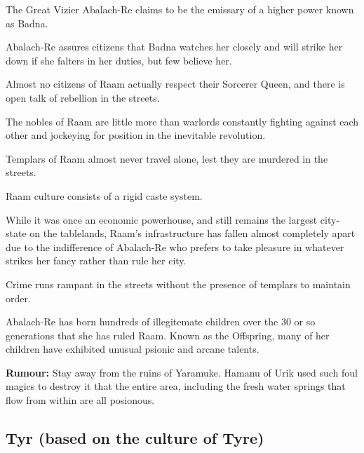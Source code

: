 \begin{multicols}{2}
\begin{description}
    \item The Great Vizier Abalach-Re claims to be the emissary of a higher power known as Badna.
    \item Abalach-Re assures citizens that Badna watches her closely and will strike her down if she falters in her duties, but few believe her.
    \item Almost no citizens of Raam actually respect their Sorcerer Queen, and there is open talk of rebellion in the streets.
    \item The nobles of Raam are little more than warlords constantly fighting against each other and jockeying for position in the inevitable revolution.
    \item Templars of Raam almost never travel alone, lest they are murdered in the streets.
    \item Raam culture consists of a rigid caste system.
    \item While it was once an economic powerhouse, and still remains the largest city-state on the tablelands, Raam’s infrastructure has fallen almost completely apart due to the indifference of Abalach-Re who prefers to take pleasure in whatever strikes her fancy rather than rule her city.
    \item Crime runs rampant in the streets without the presence of templars to maintain order.
    \item Abalach-Re has born hundreds of illegitemate children over the 30 or so generations that she has ruled Raam. Known as the Offspring, many of her children have exhibited unusual psionic and arcane talents.
    \item \textbf{Rumour:} Stay away from the ruins of Yaramuke. Hamanu of Urik used such foul magics to destroy it that the entire area, including the fresh water springs that flow from within are all posionous.
\end{description}

\subsection{Tyr (based on the culture of Tyre)}


\end{multicols}
